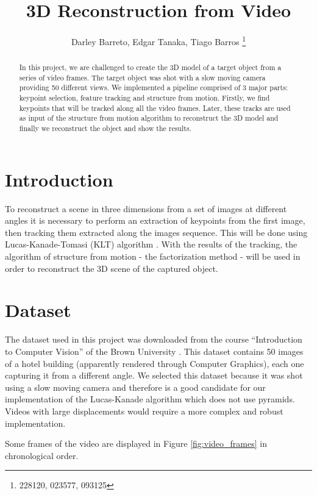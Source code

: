 \documentclass[]{IEEEtran}
\begin{document}
  \title{3D Reconstruction from Video}
  \author{Darley Barreto, Edgar Tanaka, Tiago Barros
    \thanks{228120, 023577, 093125}
  }
  \maketitle

\begin{abstract}
In this project, we are challenged to create the 3D model of a target object from a series of video frames. The target object was shot with a slow moving camera providing 50 different views. We implemented a pipeline comprised of 3 major parts: keypoint selection, feature tracking and structure from motion. Firstly, we find keypoints that will be tracked along all the video frames. Later, these tracks are used as input of the structure from motion algorithm to reconstruct the 3D model and finally we reconstruct the object and show the results.
\end{abstract}

\section{Introduction}
To reconstruct a scene in three dimensions from a set of images at different angles it is necessary to perform an extraction of keypoints from the first image, then tracking them extracted along the images sequence. This will be done using Lucas-Kanade-Tomasi (KLT) algorithm \cite{tomasi_kanade}\cite{lucas_kanade}. With the results of the tracking, the algorithm of structure from motion - the factorization method \cite{sfm_paper} - will be used in order to reconstruct the 3D scene of the captured object.


\section{Dataset}
The dataset used in this project was downloaded from the course ``Introduction to Computer Vision'' of the Brown University \cite{brown_cv}. This dataset contains 50 images of a hotel building (apparently rendered through Computer Graphics), each one capturing it from a different angle. We selected this dataset because it was shot using a slow moving camera and therefore is a good candidate for our implementation of the Lucas-Kanade algorithm which does not use pyramids. Videos with large displacements would require a more complex and robust implementation.

Some frames of the video are displayed in Figure \ref{fig:video_frames} in chronological order.
\end{document}
